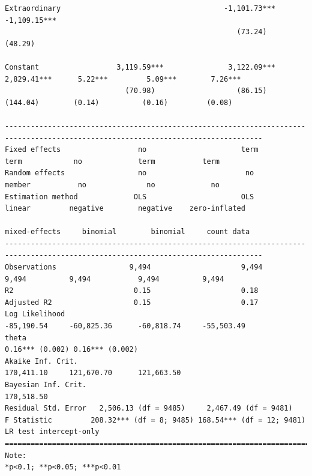 \documentclass[letter,12pt]{article}
\begin{document}
\begin{table}
\begin{tiny}
\begin{verbatim}
Extraordinary                                      -1,101.73***        -1,109.15***                                               
                                                      (73.24)             (48.29)                                                 
                                                                                                                                  
Constant                  3,119.59***               3,122.09***         2,829.41***      5.22***         5.09***        7.26***   
                            (70.98)                   (86.15)            (144.04)        (0.14)          (0.16)         (0.08)    
                                                                                                                                  
----------------------------------------------------------------------------------------------------------------------------------
Fixed effects                  no                      term                term            no             term           term
Random effects                 no                       no                member           no              no             no
Estimation method             OLS                      OLS                linear         negative        negative    zero-inflated
                                                                       mixed-effects     binomial        binomial     count data   
----------------------------------------------------------------------------------------------------------------------------------
Observations                 9,494                     9,494               9,494          9,494           9,494          9,494    
R2                            0.15                     0.18                                                                       
Adjusted R2                   0.15                     0.17                                                                       
Log Likelihood                                                          -85,190.54     -60,825.36      -60,818.74     -55,503.49  
theta                                                                                0.16*** (0.002) 0.16*** (0.002)              
Akaike Inf. Crit.                                                       170,411.10     121,670.70      121,663.50                 
Bayesian Inf. Crit.                                                     170,518.50                                                
Residual Std. Error   2,506.13 (df = 9485)     2,467.49 (df = 9481)                                                               
F Statistic         208.32*** (df = 8; 9485) 168.54*** (df = 12; 9481)
LR test intercept-only      
==================================================================================================================================
Note:                                                                                                  *p<0.1; **p<0.05; ***p<0.01
\end{verbatim}
  \end{tiny}
  \caption{Models of legislative debate. Standard errors in parentheses. } 
  \label{T:app-regs} 
\end{table} 
\end{document}
